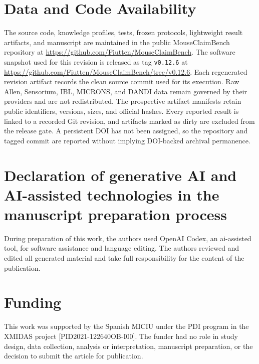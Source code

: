 \documentclass[review,12pt]{elsarticle}
\begin{document}
\section*{Data and Code Availability}
\label{sec:data-code-availability}
The source code, knowledge profiles, tests, frozen protocols, lightweight result artifacts, and manuscript are maintained in the public MouseClaimBench repository at \url{https://github.com/Fiutten/MouseClaimBench}. The software snapshot used for this revision is released as tag \texttt{v0.12.6} at \url{https://github.com/Fiutten/MouseClaimBench/tree/v0.12.6}. Each regenerated revision artifact records the clean source commit used for its execution. Raw Allen, Sensorium, IBL, MICRONS, and DANDI data remain governed by their providers and are not redistributed. The prospective artifact manifests retain public identifiers, versions, sizes, and official hashes. Every reported result is linked to a recorded Git revision, and artifacts marked as dirty are excluded from the release gate. A persistent DOI has not been assigned, so the repository and tagged commit are reported without implying DOI-backed archival permanence.

\section*{Declaration of generative AI and AI-assisted technologies in the manuscript preparation process}
\label{sec:generative-ai}
During preparation of this work, the authors used OpenAI Codex, an \ac{ai}-assisted tool, for software assistance and language editing. The authors reviewed and edited all generated material and take full responsibility for the content of the publication.

\section*{Funding}
\label{sec:funding}
This work was supported by the Spanish MICIU under the PDI program in the XMIDAS project [PID2021-122640OB-I00]. The funder had no role in study design, data collection, analysis or interpretation, manuscript preparation, or the decision to submit the article for publication.

\setlength{\bibsep}{0pt}


\end{document}
